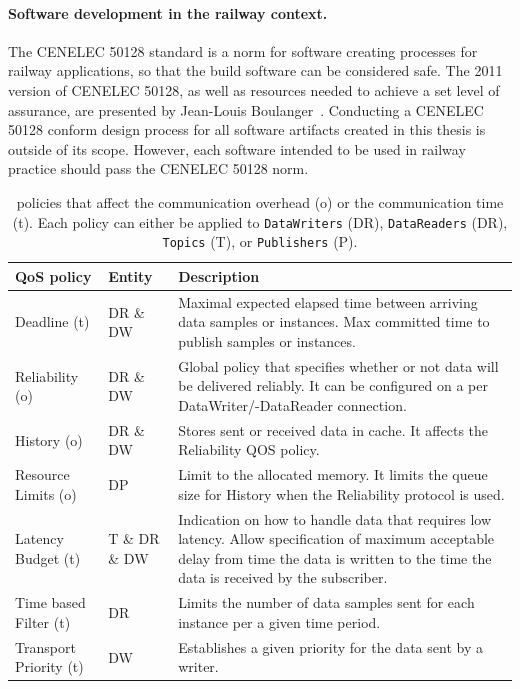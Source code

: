 \paragraph{Software development in the railway context.}
The CENELEC 50128 standard is a norm for software creating processes for railway applications, so that the build software can be considered safe.
The 2011 version of CENELEC 50128, as well as resources needed to achieve a set level of assurance, are presented by Jean-Louis Boulanger~\cite{BoulangerStandards}.
Conducting a CENELEC 50128 conform design process for all software artifacts created in this thesis is outside of its scope.
However, each software intended to be used in railway practice should pass the CENELEC 50128 norm.
\\

\begin{table}[h!]
	\begin{center}
		\caption{ policies that affect the communication overhead (o) or the communication time (t). Each  policy can either be applied to \texttt{DataWriters} (DR), \texttt{DataReaders} (DR), \texttt{Topics} (T), or \texttt{Publishers} (P).}
		\label{tab:qos_garciavalls}
		\begin{tabularx}{\textwidth}{|l|l|X|}
			\hline
			\textbf{QoS policy} & \textbf{Entity} & \textbf{Description}\\
			\hline \hline
			Deadline (t) & DR \& DW & Maximal expected elapsed time between arriving data samples or instances. Max committed time to publish samples or instances.\\
			\hline
			Reliability (o) & DR \& DW & Global policy that specifies whether or not data will be delivered reliably. It can be configured on a per DataWriter/-DataReader connection. \\
			\hline
			History (o) & DR \& DW & Stores sent or received data in cache. It affects the Reliability \gls*{QOS} policy. \\
			\hline
			Resource Limits (o) & DP & Limit to the allocated memory. It limits the queue size for History when the Reliability protocol is used. \\
			\hline
			Latency Budget (t) & T \& DR \& DW & Indication on how to handle data that requires low latency. Allow specification of maximum acceptable delay from time the data is written to the time the data is received by the subscriber. \\
			\hline
			Time based Filter (t) & DR & Limits the number of data samples sent for each instance per a given time period. \\
			\hline
			Transport Priority (t) & DW & Establishes a given priority for the data sent by a writer.\\
			\hline
		\end{tabularx}
	\end{center}
\end{table}


